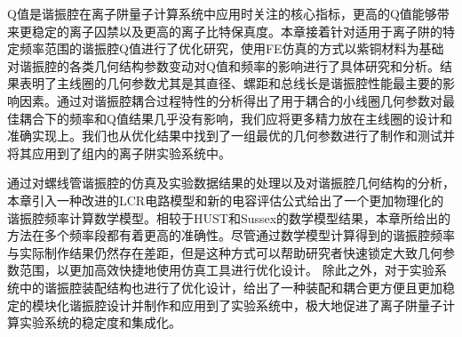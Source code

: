 Q值是谐振腔在离子阱量子计算系统中应用时关注的核心指标，更高的Q值能够带来更稳定的离子囚禁以及更高的离子比特保真度。本章接着针对适用于离子阱的特定频率范围的谐振腔Q值进行了优化研究，使用FE仿真的方式以紫铜材料为基础对谐振腔的各类几何结构参数变动对Q值和频率的影响进行了具体研究和分析。结果表明了主线圈的几何参数尤其是其直径、螺距和总线长是谐振腔性能最主要的影响因素。通过对谐振腔耦合过程特性的分析得出了用于耦合的小线圈几何参数对最佳耦合下的频率和Q值结果几乎没有影响，我们应将更多精力放在主线圈的设计和准确实现上。我们也从优化结果中找到了一组最优的几何参数进行了制作和测试并将其应用到了组内的离子阱实验系统中。

通过对螺线管谐振腔的仿真及实验数据结果的处理以及对谐振腔几何结构的分析，本章引入一种改进的LCR电路模型和新的电容评估公式给出了一个更加物理化的谐振腔频率计算数学模型。相较于HUST和Sussex的数学模型结果，本章所给出的方法在多个频率段都有着更高的准确性。尽管通过数学模型计算得到的谐振腔频率与实际制作结果仍然存在差距，但是这种方式可以帮助研究者快速锁定大致几何参数范围，以更加高效快捷地使用仿真工具进行优化设计。
除此之外，对于实验系统中的谐振腔装配结构也进行了优化设计，给出了一种装配和耦合更方便且更加稳定的模块化谐振腔设计并制作和应用到了实验系统中，极大地促进了离子阱量子计算实验系统的稳定度和集成化。